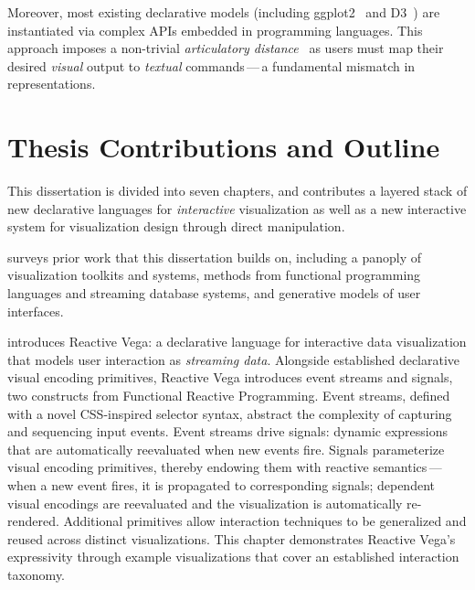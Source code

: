 Moreover, most existing declarative models (including
ggplot2~\cite{wickham:layered} and D3~\cite{bostock:d3}) are instantiated via
complex APIs embedded in programming languages. This approach imposes a
non-trivial \emph{articulatory distance}~\cite{hutchins:directmanip} as users
must map their desired \emph{visual} output to \emph{textual} commands\,---\,a
fundamental mismatch in representations.

\vspace{-10pt}

\section{Thesis Contributions and Outline}

\vspace{-10pt}

This dissertation is divided into seven chapters, and contributes a layered
stack of new declarative languages for \emph{interactive} visualization as well
as a new interactive system for visualization design through direct
manipulation.

 surveys prior work that this dissertation builds on,
including a panoply of visualization toolkits and systems, methods from
functional programming languages and streaming database systems, and generative
models of user interfaces.

 introduces Reactive Vega: a declarative language for
interactive data visualization that models user interaction as \emph{streaming
data}. Alongside established declarative visual encoding primitives, Reactive
Vega introduces event streams and signals, two constructs from Functional
Reactive Programming. Event streams, defined with a novel CSS-inspired selector
syntax, abstract the complexity of capturing and sequencing input events. Event
streams drive signals: dynamic expressions that are automatically reevaluated
when new events fire. Signals parameterize visual encoding primitives, thereby
endowing them with reactive semantics\,---\,when a new event fires, it is
propagated to corresponding signals; dependent visual encodings are reevaluated
and the visualization is automatically re-rendered. Additional primitives allow
interaction techniques to be generalized and reused across distinct
visualizations. This chapter demonstrates Reactive Vega's expressivity through
example visualizations that cover an established interaction taxonomy.

